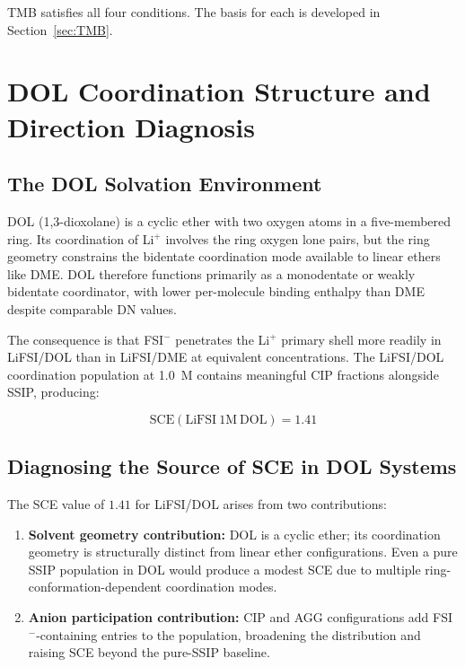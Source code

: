 \documentclass[11pt]{article}
\theoremstyle{plain}
\theoremstyle{definition}
\theoremstyle{remark}
\begin{document}
TMB satisfies all four conditions.  The basis for each is developed in
Section~\ref{sec:TMB}.

\section{DOL Coordination Structure and Direction Diagnosis}
\label{sec:DOL_diagnosis}

\subsection{The DOL Solvation Environment}

DOL (1,3-dioxolane) is a cyclic ether with two oxygen atoms in a
five-membered ring.  Its coordination of Li$^+$ involves the ring
oxygen lone pairs, but the ring geometry constrains the bidentate
coordination mode available to linear ethers like DME.  DOL therefore
functions primarily as a monodentate or weakly bidentate coordinator,
with lower per-molecule binding enthalpy than DME despite comparable
DN values.

The consequence is that FSI$^-$ penetrates the Li$^+$ primary shell
more readily in LiFSI/DOL than in LiFSI/DME at equivalent
concentrations.  The LiFSI/DOL coordination population at 1.0~M
contains meaningful CIP fractions alongside SSIP, producing:

\begin{equation}
  \mathrm{SCE}(\mathrm{LiFSI\ 1M\ DOL}) = 1.41
  \label{eq:SCE_DOL}
\end{equation}

\subsection{Diagnosing the Source of SCE in DOL Systems}

The SCE value of $1.41$ for LiFSI/DOL arises from two contributions:
\begin{enumerate}[leftmargin=2em]
  \item \textbf{Solvent geometry contribution:} DOL is a cyclic ether;
        its coordination geometry is structurally distinct from linear
        ether configurations.  Even a pure SSIP population in DOL would
        produce a modest SCE due to multiple ring-conformation-dependent
        coordination modes.
  \item \textbf{Anion participation contribution:} CIP and AGG
        configurations add FSI$^-$-containing entries to the population,
        broadening the distribution and raising SCE beyond the pure-SSIP
        baseline.
\end{enumerate}
\end{document}
